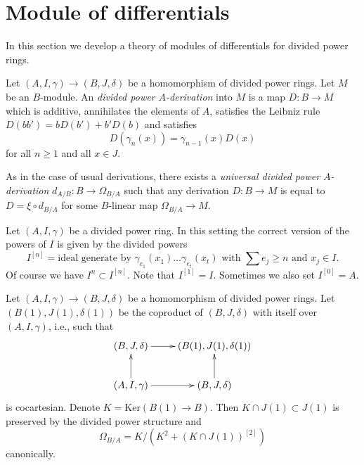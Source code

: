 \section{Module of differentials}
\label{section-differentials}

\noindent
In this section we develop a theory of modules of differentials
for divided power rings.

\begin{definition}
\label{definition-derivation}
Let $(A, I, \gamma) \to (B, J, \delta)$ be a homomorphism
of divided power rings. Let $M$ be an $B$-module.
An {\it divided power $A$-derivation} into $M$ is a map $D : B \to M$ which is
additive, annihilates the elements of $A$, satisfies the
Leibniz rule $D(bb') = bD(b') + b'D(b)$ and satisfies
$$
D(\gamma_n(x)) = \gamma_{n - 1}(x)D(x)
$$
for all $n \geq 1$ and all $x \in J$.
\end{definition}

\noindent
As in the case of usual derivations, there exists a
{\it universal divided power $A$-derivation} $d_{A/B} : B \to \Omega_{B/A}$
such that any derivation $D : B \to M$ is equal to
$D = \xi \circ d_{B/A}$ for some $B$-linear map $\Omega_{B/A} \to M$.

\medskip\noindent
Let $(A, I, \gamma)$ be a divided power ring. In this setting the
correct version of the powers of $I$ is given by the divided powers
$$
I^{[n]} = \text{ideal generate by }
\gamma_{e_1}(x_1) \ldots \gamma_{e_t}(x_t)
\text{ with }\sum e_j \geq n\text{ and }x_j \in I.
$$
Of course we have $I^n \subset I^{[n]}$. Note that $I^{[1]} = I$.
Sometimes we also set $I^{[0]} = A$.

\begin{lemma}
\label{lemma-diagonal-and-differentials}
Let $(A, I, \gamma) \to (B, J, \delta)$ be a homomorphism
of divided power rings. Let $(B(1), J(1), \delta(1))$ be the coproduct
of $(B, J, \delta)$ with itself over $(A, I, \gamma)$, i.e.,
such that
$$
\xymatrix{
(B, J, \delta) \ar[r] & (B(1), J(1), \delta(1)) \\
(A, I, \gamma) \ar[r] \ar[u] & (B, J, \delta) \ar[u]
}
$$
is cocartesian. Denote $K = \text{Ker}(B(1) \to B)$.
Then $K \cap J(1) \subset J(1)$ is preserved by the divided power
structure and
$$
\Omega_{B/A} = K/ \left(K^2 + (K \cap J(1))^{[2]}\right)
$$
canonically.
\end{lemma}

